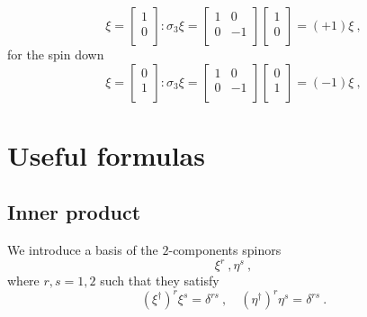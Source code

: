     \begin{equation*}
        \xi = \begin{bmatrix}
            1 \\ 0 \\
        \end{bmatrix} \colon \sigma_3 \xi = \begin{bmatrix}
            1 & 0 \\ 0 & -1 \\
        \end{bmatrix} \begin{bmatrix}
            1 \\ 0 \\
        \end{bmatrix} = (+1) \xi ~,
    \end{equation*}
    for the spin down
    \begin{equation*}
        \xi = \begin{bmatrix}
            0 \\ 1 \\
        \end{bmatrix} \colon \sigma_3 \xi = \begin{bmatrix}
            1 & 0 \\ 0 & -1 \\
        \end{bmatrix} \begin{bmatrix}
            0 \\ 1 \\
        \end{bmatrix} = (-1) \xi ~,
    \end{equation*}

\chapter{Useful formulas} 

\section{Inner product}

    We introduce a basis of the $2$-components spinors 
    \begin{equation*}
        \xi^r ~, \eta^s ~,
    \end{equation*}
    where $r,s = 1,2$ such that they satisfy 
    \begin{equation*}
        (\xi^\dagger)^r \xi^s = \delta^{rs} ~, \quad (\eta^\dagger)^r \eta^s = \delta^{rs}  ~.
    \end{equation*}

